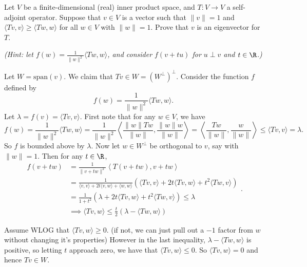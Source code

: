 \begin{problem}
Let $V$ be a finite-dimensional (real) inner product space, and $T : V \to V$ a self-adjoint
operator. Suppose that $v \in V$ is a vector such that $\|v\| = 1$ and $\langle Tv, v \rangle \geq \langle Tw, w \rangle$ for all $w \in V$ with $\|w\|=1$. Prove that $v$ is an eigenvector for $T$. 
\end{problem}

\textit{(Hint: let $f(w)=\frac{1}{\|w\|^2}\langle Tw,w\rangle$, and consider $f(v+tu)$
for $u\perp v$ and $t\in\R$.)}

Let $W=\mathrm{span}(v)$. We claim that $Tv\in W=(W^\perp)^\perp$. Consider the function $f$ defined by
\[
  f(w)=\frac{1}{\|w\|^2}\langle Tw, w\rangle
.\]
Let $\lambda=f(v)=\langle Tv, v\rangle$. First note that for any $w\in V$, we have
\[
  f(w)=\frac{1}{\|w\|^2}\langle Tw, w\rangle = \frac{1}{\|w\|^2}\left\langle \frac{\|w\|Tw}{\|w\|}, \frac{\|w\|w}{\|w\|}\right\rangle = \left\langle \frac{Tw}{\|w\|}, \frac{w}{\|w\|}\right\rangle \leq \langle Tv, v\rangle = \lambda
.\]
So $f$ is bounded above by $\lambda$. Now let $w\in W^\perp$ be orthogonal to $v$, say with $\|w\|=1$. Then for any $t\in \R$,
\[
  \begin{aligned}
    f(v+tw)&=\frac{1}{\|v+tw\|^2}\left\langle T(v+tw), v+tw\right\rangle\\
    &=\frac{1}{\langle v, v\rangle + 2t\langle v, w\rangle + \langle w, w\rangle}\left(\langle Tv, v\rangle + 2t\langle Tv, w\rangle + t^2\langle Tw, v\rangle\right)\\
    &=\frac{1}{1+t^2}\left(\lambda + 2t\langle Tv, w\rangle + t^2\langle Tw, v\rangle\right)\leq \lambda\\
    &\implies \langle Tv, w\rangle \leq \frac{t}{2}\left(\lambda - \langle Tw, w\rangle\right)
  \end{aligned}
.\] 
   
Assume WLOG that $\langle Tv, w\rangle\geq 0$. (if not, we can just pull out a $-1$ factor from $w$ without changing it's properties) However in the last inequality, $\lambda - \langle Tw, w\rangle$ is positive, so letting $t$ approach zero, we have that $\langle Tv, w\rangle\leq 0$. So $\langle Tv, w\rangle=0$ and hence $Tv\in W$.    